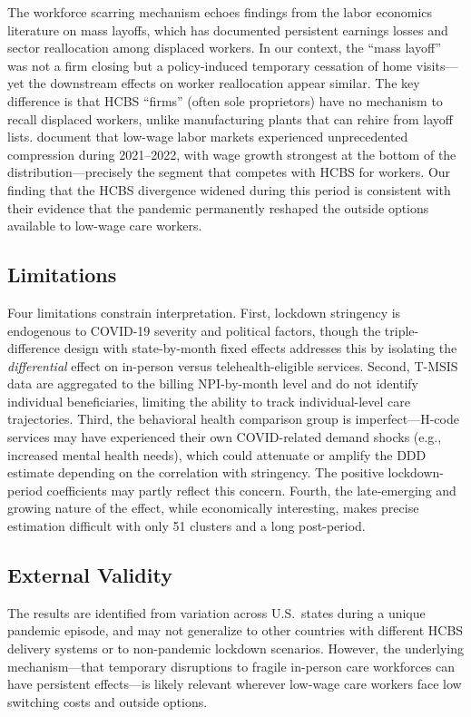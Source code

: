 \documentclass[12pt]{article}
\begin{document}
The workforce scarring mechanism echoes findings from the labor economics literature on mass layoffs, which has documented persistent earnings losses and sector reallocation among displaced workers. In our context, the ``mass layoff'' was not a firm closing but a policy-induced temporary cessation of home visits---yet the downstream effects on worker reallocation appear similar. The key difference is that HCBS ``firms'' (often sole proprietors) have no mechanism to recall displaced workers, unlike manufacturing plants that can rehire from layoff lists. \citet{autor2023compression} document that low-wage labor markets experienced unprecedented compression during 2021--2022, with wage growth strongest at the bottom of the distribution---precisely the segment that competes with HCBS for workers. Our finding that the HCBS divergence widened during this period is consistent with their evidence that the pandemic permanently reshaped the outside options available to low-wage care workers.

\subsection{Limitations}

Four limitations constrain interpretation. First, lockdown stringency is endogenous to COVID-19 severity and political factors, though the triple-difference design with state-by-month fixed effects addresses this by isolating the \textit{differential} effect on in-person versus telehealth-eligible services. Second, T-MSIS data are aggregated to the billing NPI-by-month level and do not identify individual beneficiaries, limiting the ability to track individual-level care trajectories. Third, the behavioral health comparison group is imperfect---H-code services may have experienced their own COVID-related demand shocks (e.g., increased mental health needs), which could attenuate or amplify the DDD estimate depending on the correlation with stringency. The positive lockdown-period coefficients may partly reflect this concern. Fourth, the late-emerging and growing nature of the effect, while economically interesting, makes precise estimation difficult with only 51 clusters and a long post-period.

\subsection{External Validity}

The results are identified from variation across U.S.\ states during a unique pandemic episode, and may not generalize to other countries with different HCBS delivery systems or to non-pandemic lockdown scenarios. However, the underlying mechanism---that temporary disruptions to fragile in-person care workforces can have persistent effects---is likely relevant wherever low-wage care workers face low switching costs and outside options.
\end{document}
